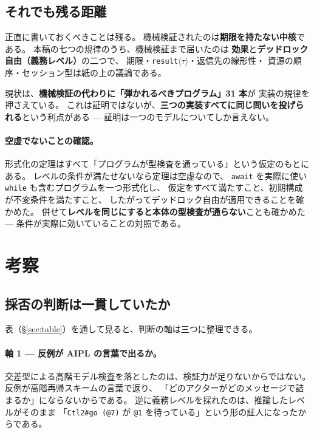 \documentclass[11pt,a4paper]{ltjsarticle}
\theoremstyle{definition}
\theoremstyle{remark}
\begin{document}
\subsection{それでも残る距離}

正直に書いておくべきことは残る。
機械検証されたのは\textbf{期限を持たない中核}である。
本稿の七つの規律のうち、機械検証まで届いたのは
\textbf{効果}と\textbf{デッドロック自由（義務レベル）}の二つで、
期限・\texttt{result}$\langle\tau\rangle$・返信先の線形性・
資源の順序・セッション型は紙の上の議論である。

現状は、\textbf{機械検証の代わりに「弾かれるべきプログラム」31 本}が
実装の規律を押さえている。
これは証明ではないが、\textbf{三つの実装すべてに同じ問いを投げられる}という利点がある ---
証明は一つのモデルについてしか言えない。

\paragraph{空虚でないことの確認。}
形式化の定理はすべて「プログラムが型検査を通っている」という仮定のもとにある。
レベルの条件が満たせないなら定理は空虚なので、
\texttt{await} を実際に使い \texttt{while} も含むプログラムを一つ形式化し、
仮定をすべて満たすこと、初期構成が不変条件を満たすこと、
したがってデッドロック自由が適用できることを確かめた。
併せて\textbf{レベルを同じにすると本体の型検査が通らない}ことも確かめた ---
条件が実際に効いていることの対照である。

\section{考察}
\label{sec:discuss}

\subsection{採否の判断は一貫していたか}

表（\S\ref{sec:table}）を通して見ると、判断の軸は三つに整理できる。

\paragraph{軸 1 --- 反例が AIPL の言葉で出るか。}
交差型による高階モデル検査を落としたのは、検証力が足りないからではない。
反例が高階再帰スキームの言葉で返り、
「どのアクターがどのメッセージで詰まるか」にならないからである。
逆に義務レベルを採れたのは、推論したレベルがそのまま
「\texttt{Ctl2\#go (@7)} が \texttt{@1} を待っている」という形の証人になったからである。
\end{document}
